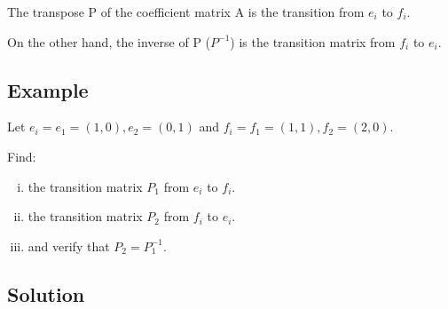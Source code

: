 \documentclass{book}
\begin{document}
The transpose P of the coefficient matrix A is the transition from \(e_i\) to \(f_i\).

On the other hand, the inverse of P (\(P^{-1}\)) is the transition matrix from \(f_i\) to \(e_i\).

\subsection{Example}
\label{sec:example-1}

Let \({e_i} = {e_1 = (1, 0), e_2 = (0, 1)}\) and \({f_i} = {f_1 = (1, 1), f_2 = (2, 0)}\).

Find:

\begin{enumerate}[i.]
	\item the transition matrix \(P_1\) from \({e_i}\) to \({f_i}\).
	\item the transition matrix \(P_2\) from \({f_i}\) to \({e_i}\).
	\item and verify that \(P_2 = P^{-1}_1\).
\end{enumerate}

\subsection*{Solution}
\end{document}
